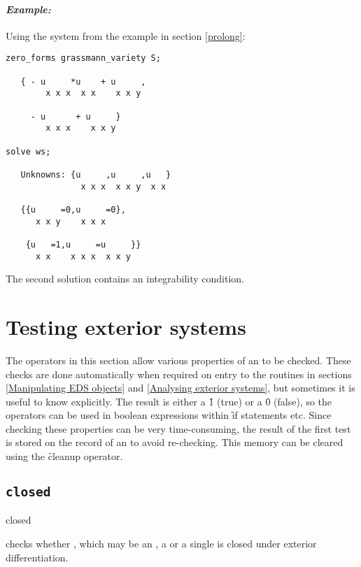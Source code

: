 \paragraph{\it Example:}
Using the system from the example in section \ref{prolong}:
\begin{verbatim}
zero_forms grassmann_variety S;

   { - u     *u    + u     ,
        x x x  x x    x x y 
   
     - u      + u     }
        x x x    x x y 

solve ws;

   Unknowns: {u     ,u     ,u   }
               x x x  x x y  x x
   
   {{u     =0,u     =0},
      x x y    x x x 
   
    {u   =1,u     =u     }}
      x x    x x x  x x y 
\end{verbatim}
The second solution contains an integrability condition.



\section{Testing exterior systems}
\label{Testing exterior systems}

The operators in this section allow various properties of an  to
be checked. These checks are done automatically when required on entry to
the routines in sections \ref{Manipulating EDS objects} and \ref{Analysing
exterior systems}, but sometimes it is useful to know explicitly. The
result is either a \f{1} (true) or a \f{0} (false), so the operators can be
used in boolean expressions within \f{if} statements etc.  Since checking
these properties can be very time-consuming, the result of the first test
is stored on the  record of an  to avoid
re-checking. This memory can be cleared using the \f{cleanup} operator.

\subsection{\tt closed}
\label{closed}

\begin{syntax}
	closed 
\end{syntax}
checks whether , which may be an , a  or a
single  is closed under exterior differentiation.

